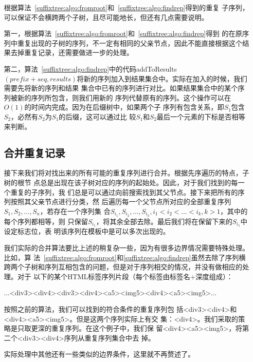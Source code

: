 

根据算法~\ref{suffixtree:algo:fromroot}和~\ref{suffixtree:algo:findrep}得到的重复
子序列，可以保证不会横跨两个子树，且尽可能地长，但还有几点需要说明。

第一，根据算法~\ref{suffixtree:algo:fromroot}和~\ref{suffixtree:algo:findrep}得到
的在原序列中重复出现的子树的序列，不一定有相同的父亲节点，因此不能直接根据这个结
果去掉重复记录，还需要做进一步的处理。

第二，算法~\ref{suffixtree:algo:findrep}中的代码addToResults$(prefix + seq,
results)$将新的序列加入到结果集合中。实际在加入的时候，我们需要先将新的序列和结果
集合中已有的序列进行对比。如果结果集合中的某个序列被新的序列所包含，则我们用新的
序列代替原有的序列。这个操作可以在$O(1)$的时间内完成。因为在后缀树中，如果两个子
序列有包含关系，即$S_1$包含$S_2$，必然有$S_2$为$S_1$的后缀，这可以通过比
较$S_1$和$S_2$最后一个元素的下标是否相等来判断。

\subsection{合并重复记录}
接下来我们将对找出来的所有可能的重复序列进行合并。根据先序遍历的特点，子树的根节
点总是出现在该子树对应的序列的起始处。因此，对于我们找到的每一个重复的子序列，我
们总是可以通过向前搜索找到其父节点。接下来把所有的序列按照其父亲节点进行分类，然
后遍历每一个父节点所对应的全部重复序列$S_1,S_2,...,S_n$，若存在一个序列集
合${S_{i_1},S_{i_2},...,S_{i_k}}, i_1<i_2<...<i_k, k>1$，其中的每个序列都相等，则
只保留$S_{i_1}$，将其余全部去除。最后我们将在保留下来的$S_{i_1}$中设定标志位，表
明该序列在模板中是可以多次出现的。

我们实际的合并算法要比上述的稍复杂一些，因为有很多边界情况需要特殊处理。比如，算
法~\ref{suffixtree:algo:fromroot}和\ref{suffixtree:algo:findrep}虽然去除了序列横
跨两个子树和序列互相包含的问题，但是对于序列相交的情况，并没有做相应的处理。对于
以下的某个HTML标签序列片段（每个标签由{标签名+深度}组成）：
\begin{center}
  ...<div3><div4><div3><div4><a5><img5><div4><a5><img5>...
\end{center}
按照之前的算法，我们可以找到的符合条件的重复序列包
括{<div3><div4>}和{<div4><a5><img5>}。但是这两个序列实际上有交
集：{<div4>}。我们采取的策略是只取更深的重复序列。在这个例子中，我们保
留{<div4><a5><img5>}，将第二个{<div3><div4>}序列从重复序列集合中去
掉。

实际处理中其他还有一些类似的边界条件，这里就不再赘述了。

